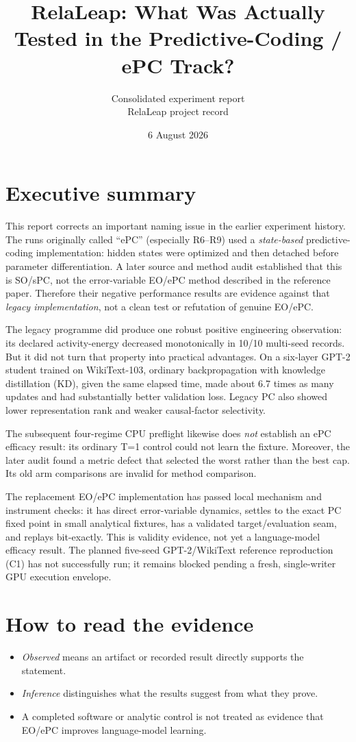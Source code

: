 \documentclass[10pt,a4paper]{article}
\title{RelaLeap: What Was Actually Tested in the Predictive-Coding / ePC Track?}
\author{Consolidated experiment report\\RelaLeap project record}
\date{6 August 2026}
\begin{document}
\maketitle

\section*{Executive summary}
This report corrects an important naming issue in the earlier experiment history.
The runs originally called ``ePC'' (especially R6--R9) used a \emph{state-based}
predictive-coding implementation: hidden states were optimized and then detached
before parameter differentiation.  A later source and method audit established
that this is SO/sPC, not the error-variable EO/ePC method described in the
reference paper.  Therefore their negative performance results are evidence
against that \emph{legacy implementation}, not a clean test or refutation of
genuine EO/ePC.

The legacy programme did produce one robust positive engineering observation:
its declared activity-energy decreased monotonically in 10/10 multi-seed
records.  But it did not turn that property into practical advantages.  On a
six-layer GPT-2 student trained on WikiText-103, ordinary backpropagation with
knowledge distillation (KD), given the same elapsed time, made about 6.7 times
as many updates and had substantially better validation loss.  Legacy PC also
showed lower representation rank and weaker causal-factor selectivity.

The subsequent four-regime CPU preflight likewise does \emph{not} establish an
ePC efficacy result: its ordinary T=1 control could not learn the fixture.
Moreover, the later audit found a metric defect that selected the worst rather
than the best cap.  Its old arm comparisons are invalid for method comparison.

The replacement EO/ePC implementation has passed local mechanism and
instrument checks: it has direct error-variable dynamics, settles to the exact
PC fixed point in small analytical fixtures, has a validated target/evaluation
seam, and replays bit-exactly.  This is validity evidence, not yet a
language-model efficacy result.  The planned five-seed GPT-2/WikiText reference
reproduction (C1) has not successfully run; it remains blocked pending a fresh,
single-writer GPU execution envelope.

\section{How to read the evidence}
\begin{itemize}
\item \emph{Observed} means an artifact or recorded result directly supports the statement.
\item \emph{Inference} distinguishes what the results suggest from what they prove.
\item A completed software or analytic control is not treated as evidence that EO/ePC
  improves language-model learning.
\end{itemize}
\end{document}
